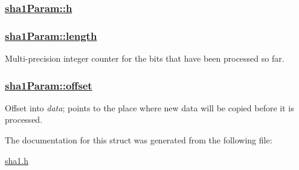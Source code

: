 \hypertarget{structsha1Param_o0}{
\subsubsection[h]{\setlength{\rightskip}{0pt plus 5cm}\hyperlink{structsha1Param_o0}{sha1Param::h}}}
\label{structsha1Param_o0}


\hypertarget{structsha1Param_o2}{
\subsubsection[length]{\setlength{\rightskip}{0pt plus 5cm}\hyperlink{structsha1Param_o2}{sha1Param::length}}}
\label{structsha1Param_o2}


Multi-precision integer counter for the bits that have been processed so far. 

\hypertarget{structsha1Param_o3}{
\subsubsection[offset]{\setlength{\rightskip}{0pt plus 5cm}\hyperlink{structsha1Param_o3}{sha1Param::offset}}}
\label{structsha1Param_o3}


Offset into {\em data\/}; points to the place where new data will be copied before it is processed. 



The documentation for this struct was generated from the following file:\begin{CompactItemize}
\item 
\hyperlink{sha1_8h}{sha1.h}\end{CompactItemize}
